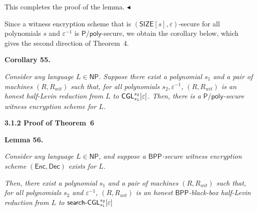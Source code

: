 This completes the proof of the lemma.
$\blacktriangleleft$\par




Since a witness encryption scheme that is $({\mathsf{SIZE}}[s],\varepsilon)$-secure for all polynomials $s$ and $\varepsilon^{-1}$ is ${\mathsf{P}}/{\mathsf{poly}}$-secure, we obtain the corollary below, which gives the second direction of Theorem 4.\par





\par\medskip\noindent\textbf{
\textbf{Corollary 55}\textbf{.}
}\par



\emph{Consider any language $L\in{\mathsf{NP}}$. Suppose there exist a polynomial $s_{1}$ and a pair of machines $(R,R_{wit})$ such that, for all polynomials $s_{2},\varepsilon^{-1}$, $(R,R_{wit})$ is an honest half-Levin reduction from $L$ to ${\sf CGL}^{s_{2}}_{s_{1}}[\varepsilon]$. Then, there is a ${\mathsf{P}}/{\mathsf{poly}}$-secure witness encryption scheme for $L$.}\par








\par\medskip\noindent\textbf{
3.1.2 Proof of Theorem 6
}\par





\par\medskip\noindent\textbf{
\textbf{Lemma 56}\textbf{.}
}\par



\emph{Consider any language $L\in{\mathsf{NP}}$, and suppose a ${\mathsf{BPP}}$-secure witness encryption scheme $({\mathsf{Enc}},{\mathsf{Dec}})$ exists for $L$.}\par




\emph{Then, there exist a polynomial $s_{1}$ and a pair of machines $(R,R_{wit})$ such that, for all polynomials $s_{2}$ and $\varepsilon^{-1}$, $(R,R_{wit})$ is an honest ${\mathsf{BPP}}$-black-box half-Levin reduction from $L$ to ${\sf search}\text{-}{\sf CGL}^{s_{2}}_{s_{1}}[\varepsilon]$}\par



